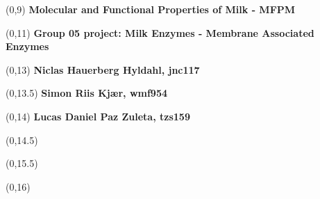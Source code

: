 \begin{titlepage}


\begin{textblock}{9.4}(0,9)
    \Huge{\sffamily\bfseries{Molecular and Functional Properties of Milk - MFPM}}
\end{textblock}


\begin{textblock}{9.4}(0,11)
    \LARGE{\sffamily\bfseries{Group 05 project: Milk Enzymes - Membrane Associated Enzymes}}
\end{textblock}

\begin{textblock}{9.4}(0,13)
    \large{\sffamily\bfseries{Niclas Hauerberg Hyldahl, jnc117}}
\end{textblock}
\begin{textblock}{9.4}(0,13.5)
    \large{\sffamily\bfseries{Simon Riis Kjær, wmf954}}
\end{textblock}
\begin{textblock}{9.4}(0,14)
    \large{\sffamily\bfseries{Lucas Daniel Paz Zuleta, tzs159}}
\end{textblock}

\begin{textblock}{9.4}(0,14.5)
    \large{}
\end{textblock}

\begin{textblock}{9.4}(0,15.5)
    \large{}
\end{textblock}

\begin{textblock}{8.4}(0,16)
    \large{}
\end{textblock}


\end{titlepage}
